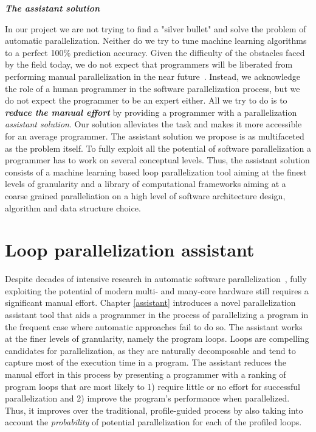 \begin{center}
\textbf{\large \textit{The assistant solution}}
\end{center}
\quad In our project we are not trying to find a "silver bullet" and solve the problem of automatic parallelization. Neither do we try to tune machine learning algorithms to a perfect 100\% prediction accuracy. Given the difficulty of the obstacles faced by the field today, we do not expect that programmers will be liberated from performing manual parallelization in the near future~\cite{Larsen:2012:PML:2410141.2410600}. Instead, we acknowledge the role of a human programmer in the software parallelization process, but we do not expect the programmer to be an expert either. All we try to do is to \textit{\textbf{reduce the manual effort}} by providing a programmer with a parallelization \textit{assistant solution}. Our solution alleviates the task and makes it more accessible for an average programmer. The assistant solution we propose is as multifaceted as the problem itself. To fully exploit all the potential of software parallelization a programmer has to work on several conceptual levels. Thus, the assistant solution consists of a machine learning based loop parallelization tool \cite{aiseps} aiming at the finest levels of granularity and a library of computational frameworks \cite{library-repo} aiming at a coarse grained paralleliation on a high level of software architecture design, algorithm and data structure choice.

\section{Loop parallelization assistant}
\label{introduction_assistant}
\quad Despite decades of intensive research in automatic software
parallelization~\cite{6813266}, fully exploiting the potential of modern multi- and many-core hardware still requires a significant manual effort. Chapter \ref{assistant} introduces a novel parallelization assistant tool that aids a programmer in the process of parallelizing a program in the frequent case where automatic approaches fail to do so. The assistant works at the finer levels of granularity, namely the program loops. Loops are compelling candidates for parallelization, as they are naturally decomposable and tend to capture most of the execution time in a program. The assistant reduces the manual effort in this process by presenting a programmer with a ranking of program loops that are most likely to 1) require little or no effort for successful parallelization and 2) improve the program's performance when parallelized. Thus, it improves over the traditional, profile-guided process by also taking into account the \emph{probability} of potential parallelization for each of the profiled loops.

